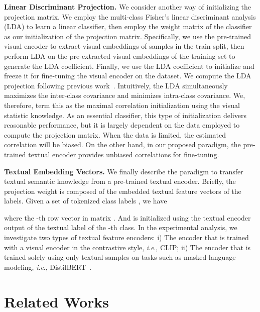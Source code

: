 \documentclass[letterpaper]{article} \usepackage{aaai23}  \usepackage{times}  \usepackage{helvet}  \usepackage{courier}  \usepackage[hyphens]{url}  \usepackage{graphicx} \urlstyle{rm} \def\UrlFont{\rm}  \usepackage{natbib}  \usepackage{caption} \frenchspacing  \setlength{\pdfpagewidth}{8.5in}  \setlength{\pdfpageheight}{11in}  \usepackage{algorithm}
\newcommand{\ie}{\textit{i}.\textit{e}.}
\begin{document}
\textbf{Linear Discriminant Projection.}\label{sec:lda}
We consider another way of initializing the projection matrix. We employ the multi-class Fisher's linear discriminant analysis (LDA) to learn a linear classifier, then employ the weight matrix of the classifier as our initialization of the projection matrix. 
Specifically, we use the pre-trained visual encoder to extract visual embeddings of samples in the train split, then perform LDA on the pre-extracted visual embeddings of the training set to generate the LDA coefficient. Finally, we use the LDA coefficient to initialize  and freeze it for fine-tuning the visual encoder on the dataset.
We compute the LDA projection following previous work~\cite{lda_coef}.
Intuitively, the LDA simultaneously maximizes the inter-class covariance and minimizes intra-class covariance.
We, therefore, term this as the maximal correlation initialization using the visual statistic knowledge. As an essential classifier, this type of initialization delivers reasonable performance, but it is largely dependent on the data employed to compute the projection matrix. When the data is limited, the estimated correlation will be biased. 
On the other hand, in our proposed paradigm, the pre-trained textual encoder provides unbiased correlations for fine-tuning.


\textbf{Textual Embedding Vectors.} 
We finally describe the paradigm to transfer textual semantic knowledge from a pre-trained textual encoder. Briefly, the projection weight  is composed of the embedded textual feature vectors of the labels. Given a set of tokenized class labels , we have 

where  the -th row vector in matrix . And  is initialized using the textual encoder output of the textual label of the -th class. 
In the experimental analysis, we investigate two types of textual feature encoders: i) The encoder that is trained with a visual encoder in the contrastive style, \ie, CLIP; ii) The encoder that is trained solely using only textual samples on tasks such as masked language modeling, \ie, DistilBERT~\cite{sanh2019distilbert}.






 
\section{Related Works}
\end{document}
